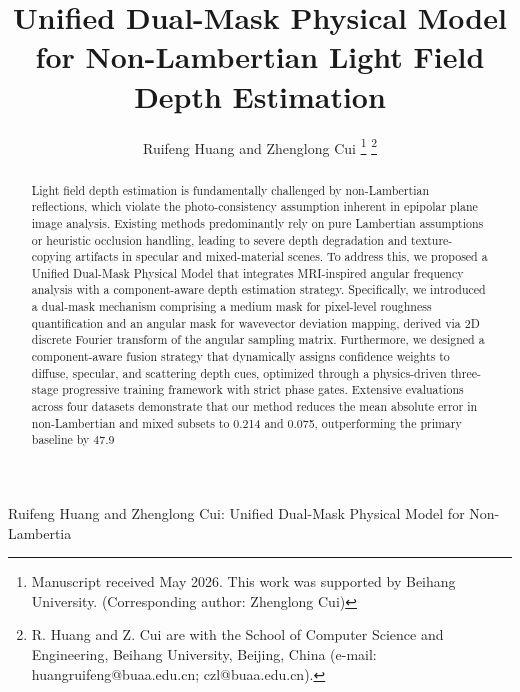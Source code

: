\documentclass[lettersize,journal]{IEEEtran}
\begin{document}
\title{Unified Dual-Mask Physical Model for Non-Lambertian Light Field Depth Estimation}

\author{Ruifeng Huang and Zhenglong Cui
\thanks{Manuscript received May 2026. This work was supported by Beihang University. (Corresponding author: Zhenglong Cui)}
\thanks{R. Huang and Z. Cui are with the School of Computer Science and Engineering, Beihang University, Beijing, China (e-mail: huangruifeng@buaa.edu.cn; czl@buaa.edu.cn).}}

%
{Ruifeng Huang and Zhenglong Cui: Unified Dual-Mask Physical Model for Non-Lambertia}

\maketitle

\begin{abstract}
Light field depth estimation is fundamentally challenged by non-Lambertian reflections, which violate the photo-consistency assumption inherent in epipolar plane image analysis. Existing methods predominantly rely on pure Lambertian assumptions or heuristic occlusion handling, leading to severe depth degradation and texture-copying artifacts in specular and mixed-material scenes. To address this, we proposed a Unified Dual-Mask Physical Model that integrates MRI-inspired angular frequency analysis with a component-aware depth estimation strategy. Specifically, we introduced a dual-mask mechanism comprising a medium mask for pixel-level roughness quantification and an angular mask for wavevector deviation mapping, derived via 2D discrete Fourier transform of the angular sampling matrix. Furthermore, we designed a component-aware fusion strategy that dynamically assigns confidence weights to diffuse, specular, and scattering depth cues, optimized through a physics-driven three-stage progressive training framework with strict phase gates. Extensive evaluations across four datasets demonstrate that our method reduces the mean absolute error in non-Lambertian and mixed subsets to 0.214 and 0.075, outperforming the primary baseline by 47.9%
\end{abstract}
\end{document}
